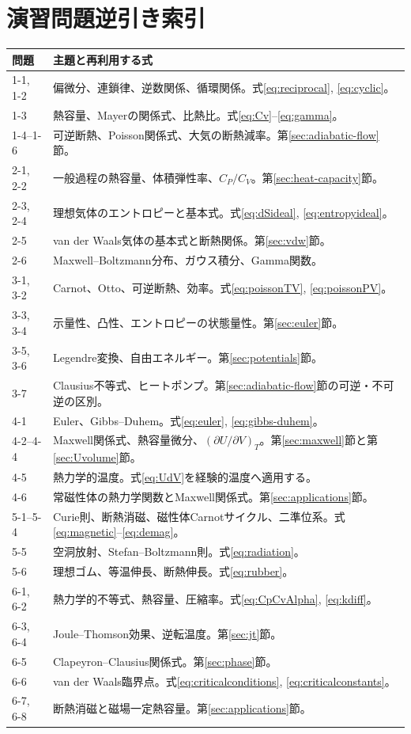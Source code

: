 \documentclass[platex,dvipdfmx,a4paper,10pt]{jsarticle}
\begin{document}
\section{演習問題逆引き索引}\label{sec:index}
\begin{longtable}{p{}p{}}
\toprule
問題 & 主題と再利用する式\\
\midrule
1-1, 1-2 & 偏微分、連鎖律、逆数関係、循環関係。式\eqref{eq:reciprocal}, \eqref{eq:cyclic}。\\
1-3 & 熱容量、Mayerの関係式、比熱比。式\eqref{eq:Cv}--\eqref{eq:gamma}。\\
1-4--1-6 & 可逆断熱、Poisson関係式、大気の断熱減率。第\ref{sec:adiabatic-flow}節。\\
2-1, 2-2 & 一般過程の熱容量、体積弾性率、$C_P/C_V$。第\ref{sec:heat-capacity}節。\\
2-3, 2-4 & 理想気体のエントロピーと基本式。式\eqref{eq:dSideal}, \eqref{eq:entropyideal}。\\
2-5 & van der Waals気体の基本式と断熱関係。第\ref{sec:vdw}節。\\
2-6 & Maxwell--Boltzmann分布、ガウス積分、Gamma関数。\\
3-1, 3-2 & Carnot、Otto、可逆断熱、効率。式\eqref{eq:poissonTV}, \eqref{eq:poissonPV}。\\
3-3, 3-4 & 示量性、凸性、エントロピーの状態量性。第\ref{sec:euler}節。\\
3-5, 3-6 & Legendre変換、自由エネルギー。第\ref{sec:potentials}節。\\
3-7 & Clausius不等式、ヒートポンプ。第\ref{sec:adiabatic-flow}節の可逆・不可逆の区別。\\
4-1 & Euler、Gibbs--Duhem。式\eqref{eq:euler}, \eqref{eq:gibbs-duhem}。\\
4-2--4-4 & Maxwell関係式、熱容量微分、$(\partial U/\partial V)_T$。第\ref{sec:maxwell}節と第\ref{sec:Uvolume}節。\\
4-5 & 熱力学的温度。式\eqref{eq:UdV}を経験的温度へ適用する。\\
4-6 & 常磁性体の熱力学関数とMaxwell関係式。第\ref{sec:applications}節。\\
5-1--5-4 & Curie則、断熱消磁、磁性体Carnotサイクル、二準位系。式\eqref{eq:magnetic}--\eqref{eq:demag}。\\
5-5 & 空洞放射、Stefan--Boltzmann則。式\eqref{eq:radiation}。\\
5-6 & 理想ゴム、等温伸長、断熱伸長。式\eqref{eq:rubber}。\\
6-1, 6-2 & 熱力学的不等式、熱容量、圧縮率。式\eqref{eq:CpCvAlpha}, \eqref{eq:kdiff}。\\
6-3, 6-4 & Joule--Thomson効果、逆転温度。第\ref{sec:jt}節。\\
6-5 & Clapeyron--Clausius関係式。第\ref{sec:phase}節。\\
6-6 & van der Waals臨界点。式\eqref{eq:criticalconditions}, \eqref{eq:criticalconstants}。\\
6-7, 6-8 & 断熱消磁と磁場一定熱容量。第\ref{sec:applications}節。\\
\bottomrule
\end{longtable}
\end{document}
